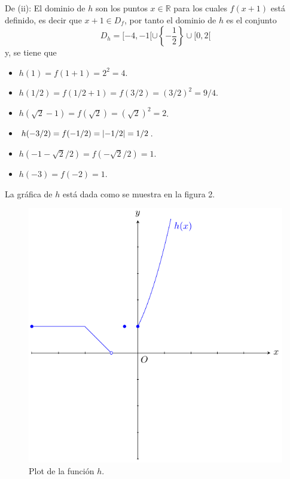 \documentclass[12pt]{article}
\begin{document}
\begin{enumerate}
\begin{sol}
        De (ii): El dominio de $h$ son los puntos $x\in\mathbb{R}$ para los cuales $f(x+1)$ está definido, es decir que $x+1\in D_f$, por tanto el dominio de $h$ es el conjunto
        \begin{equation*}
            D_h=[-4,-1[\cup\left\{-\frac{1}{2}\right\}\cup[0,2[
        \end{equation*}
        y, se tiene que
        \begin{itemize}
            \item $h(1)=f(1+1)=2^2=4$.
            \item $h(1/2)=f(1/2+1)=f(3/2)=\left(3/2\right)^2=9/4$.
            \item $h(\sqrt{2}-1)=f(\sqrt{2})=\left(\sqrt{2} \right)^2=2$.
            \item $h(-3/2)=f(-1/2)=\left| -1/2 \right|=1/2$.
            \item $h(-1-\sqrt{2}/2)=f(-\sqrt{2}/2)=1$.
            \item $h(-3)=f(-2)=1$.
        \end{itemize}
        La gráfica de $h$ está dada como se muestra en la figura 2.

        \begin{figure}
            \begin{center}
                \includegraphics[scale=1]{images/3_1_2.pdf}
            \end{center}
            \caption{Plot de la función $h$.}
        \end{figure}
        

\end{sol}
\end{enumerate}
\end{document}
